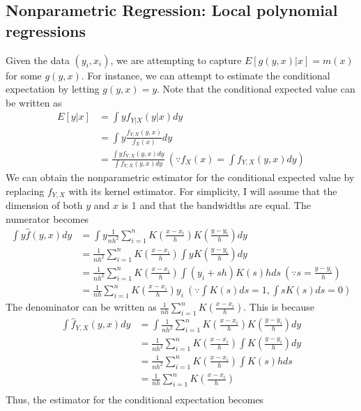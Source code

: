 \documentclass[12pt]{article}
\theoremstyle{definition}
\theoremstyle{property}
\theoremstyle{assumption}
\theoremstyle{example}
\theoremstyle{comment}
\begin{document}
  \subsection{Nonparametric Regression: Local polynomial regressions}
 Given the data $(y_i,x_i)$, we are attempting to capture $E[g(y,x)|x]=m(x)$ for some $g(y,x)$. For instance, we can attempt to estimate the conditional expectation by letting $g(y,x)=y$. Note that the conditional expected value can be written as
 \begin{align*}
 E[y|x]&=\int y f_{Y|X}(y|x)dy \\
 &=\int y \frac{f_{Y,X}(y,x)}{f_{X}(x)}dy\\
 &=\frac{\int yf_{Y,X}(y,x)dy}{\int f_{Y,X}(y,x)dy} \ (\because f_X(x) = \int f_{Y,X}(y,x)dy)
 \end{align*}
 We can obtain the nonparametric estimator for the conditional expected value by replacing $f_{Y,X}$ with its kernel estimator. For simplicity, I will assume that the dimension of both $y$ and $x$ is 1 and that the bandwidths are equal. The numerator becomes
 \footnotesize{\begin{align*}
 \int y \hat{f}(y,x)dy&=\int y \frac{1}{nh^2}\sum_{i=1}^n K\left(\frac{x-x_i}{h}\right)K\left(\frac{y-y_i}{h}\right)dy\\
 &= \frac{1}{nh^2}\sum_{i=1}^n K\left(\frac{x-x_i}{h}\right)\int yK\left(\frac{y-y_i}{h}\right)dy\\
 &=\frac{1}{nh^2}\sum_{i=1}^n K\left(\frac{x-x_i}{h}\right)\int (y_i+sh)K\left(s\right)hds \ \left(\because s=\frac{y-y_i}{h}\right)\\
 &= \frac{1}{nh}\sum_{i=1}^n K\left(\frac{x-x_i}{h}\right)y_i\ (\because \int K(s)ds=1, \int sK(s)ds=0)
 \end{align*}}\normalsize
 The denominator can be written as $ \frac{1}{nh}\sum_{i=1}^n K\left(\frac{x-x_i}{h}\right)$. This is because
 \small{\[
 \begin{aligned}
 \int \hat{f}_{Y,X}(y,x)dy&=\int \frac{1}{nh^2}\sum_{i=1}^nK\left(\frac{x-x_i}{h}\right)K\left(\frac{y-y_i}{h}\right)dy\\
 &=\frac{1}{nh^2}\sum_{i=1}^nK\left(\frac{x-x_i}{h}\right)\int K\left(\frac{y-y_i}{h}\right)dy\\
  &=\frac{1}{nh^2}\sum_{i=1}^nK\left(\frac{x-x_i}{h}\right)\int K\left(s\right)hds\\
    &=\frac{1}{nh}\sum_{i=1}^nK\left(\frac{x-x_i}{h}\right) \\
\end{aligned}
 \]}\normalsize
 Thus, the estimator for the conditional expectation becomes
\end{document}
